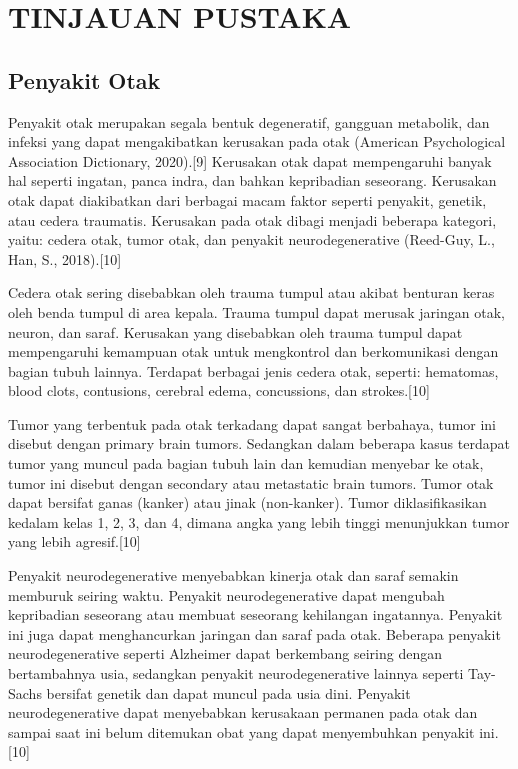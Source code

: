 \section{TINJAUAN PUSTAKA}


\subsection{Penyakit Otak}


Penyakit otak merupakan segala bentuk degeneratif, gangguan metabolik, dan infeksi yang dapat mengakibatkan kerusakan pada otak (American Psychological Association Dictionary, 2020).[9] Kerusakan otak dapat mempengaruhi banyak hal seperti ingatan, panca indra, dan bahkan kepribadian seseorang. Kerusakan otak dapat diakibatkan dari berbagai macam faktor seperti penyakit, genetik, atau cedera traumatis. Kerusakan pada otak dibagi menjadi beberapa kategori, yaitu: cedera otak, tumor otak, dan penyakit neurodegenerative (Reed-Guy, L., Han, S., 2018).[10]

Cedera otak sering disebabkan oleh trauma tumpul atau akibat benturan keras oleh benda tumpul di area kepala. Trauma tumpul dapat merusak jaringan otak, neuron, dan saraf. Kerusakan yang disebabkan oleh trauma tumpul dapat mempengaruhi kemampuan otak untuk mengkontrol dan berkomunikasi dengan  bagian tubuh lainnya. Terdapat berbagai jenis cedera otak, seperti: hematomas, blood clots, contusions, cerebral edema, concussions, dan strokes.[10]

Tumor yang terbentuk pada otak terkadang dapat sangat berbahaya, tumor ini disebut dengan primary brain tumors. Sedangkan dalam beberapa kasus terdapat tumor yang muncul pada bagian tubuh lain dan kemudian menyebar ke otak, tumor ini disebut dengan secondary atau metastatic brain tumors. Tumor otak dapat bersifat ganas (kanker) atau jinak (non-kanker). Tumor diklasifikasikan kedalam kelas 1, 2, 3, dan 4, dimana angka yang lebih tinggi menunjukkan tumor yang lebih agresif.[10]

Penyakit neurodegenerative menyebabkan kinerja otak dan saraf semakin memburuk seiring waktu. Penyakit neurodegenerative dapat mengubah kepribadian seseorang atau membuat seseorang kehilangan ingatannya. Penyakit ini juga dapat menghancurkan jaringan dan saraf pada otak. Beberapa penyakit neurodegenerative seperti Alzheimer dapat berkembang seiring dengan bertambahnya usia, sedangkan penyakit neurodegenerative lainnya seperti Tay-Sachs bersifat genetik dan dapat muncul pada usia dini. Penyakit neurodegenerative dapat menyebabkan kerusakaan permanen pada otak dan sampai saat ini belum ditemukan obat yang dapat menyembuhkan penyakit ini.[10]

